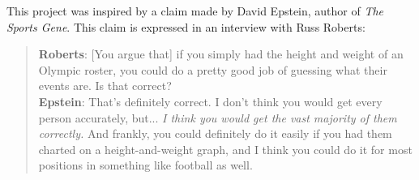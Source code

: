 \documentclass[landscape, paperwidth=42in, paperheight=36in,
fontscale=.35, margin=1in]{baposter}
\begin{document}
\begin{poster}
{This project was inspired by a claim made by David Epstein, author of \textit{The Sports Gene}. This claim is expressed in an interview with Russ Roberts:
\begin{quote}
\footnotesize
\textbf{Roberts}: [You argue that] if you simply had the height and weight of an Olympic roster, you could do a pretty good job of guessing what their events are. Is that correct? \\
\textbf{Epstein}: That's definitely correct. I don't think you would get every person accurately, but... \textit{I think you would get the vast majority of them correctly.} And frankly, you could definitely do it easily if you had them charted on a height-and-weight graph, and I think you could do it for most positions in something like football as well.
\end{quote}

 }



\end{poster}
\end{document}
